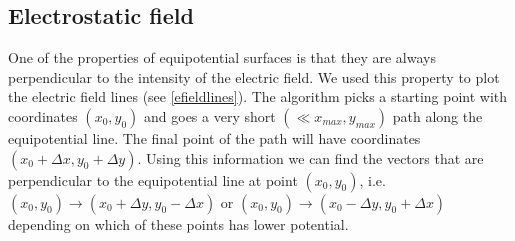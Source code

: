 \documentclass[aps,twocolumn,pre,nofootinbib,10pt]{revtex4-1}
\begin{document}
\subsection{Electrostatic field}
One of the properties of equipotential surfaces is that they are always perpendicular to the intensity of the electric field. We used this property to plot the electric field lines (see \ref{efieldlines}). The algorithm picks a starting point with coordinates \begin{math} (x_0,y_0) \end{math} and goes a very short \begin{math} (\ll x_{max},y_{max})\end{math} path along the equipotential line. The final point of the path will have coordinates \begin{math} (x_0+\Delta x, y_0 + \Delta y)\end{math}. Using this information we can find the vectors that are perpendicular to the equipotential line at point \begin{math} (x_0,y_0) \end{math}, i.e. \begin{math} (x_0,y_0) \rightarrow (x_0 + \Delta y, y_0 - \Delta x) \end{math} or \begin{math} (x_0,y_0) \rightarrow (x_0 - \Delta y, y_0 + \Delta x) \end{math} depending on which of these points has lower potential.
\end{document}
